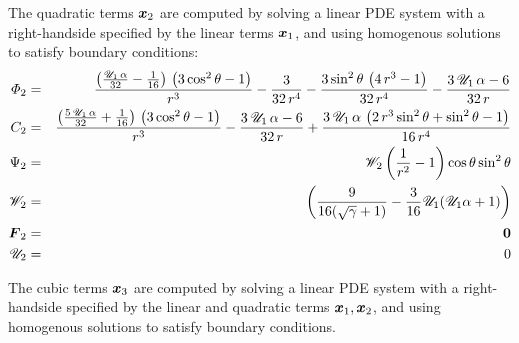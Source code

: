 The quadratic terms $\boldsymbol{x}_2$ are computed by solving a linear PDE system 
with a right-handside specified by the linear terms $\boldsymbol{x}_1$, and using 
homogenous solutions to satisfy boundary conditions:
\begin{eqnarray}
\varPhi_2 &=& \frac{\left(\frac{\mathscr{U}_1\, \alpha}{32} - \frac{1}{16}\right)\, \left(3\, {\cos^2\theta} - 1\right)}{r^3} - \frac{3}{32\, r^4} - \frac{3\, {\sin^2\theta}\, \left(4\, r^3 - 1\right)}{32\, r^4} - \frac{3\, \mathscr{U}_1\, \alpha - 6}{32\, r}
\\
C_2 &=& \frac{\left(\frac{5\, \mathscr{U}_1\, \alpha}{32} + \frac{1}{16}\right)\, \left(3\, {\cos^2\theta} - 1\right)}{r^3} - \frac{3\, \mathscr{U}_1\, \alpha - 6}{32\, r} + \frac{3\, \mathscr{U}_1\, \alpha\, \left(2\, r^3\, {\sin^2\theta} + {\sin^2\theta} - 1\right)}{16\, r^4}
\\
\Psi_2 &=& \mathscr{W}_2
 \left(\frac{1}{r^2} - 1\right) \cos\theta \sin^2\theta  \\
\mathscr{W}_2 &=& \left(\frac{9}{16(\sqrt{\gamma}+1)} - \frac{3}{16} \mathscr{U}_1 (\mathscr{U}_1 \alpha + 1)\right) \\
\boldsymbol{F}_2 &=& \boldsymbol{0} \\ \mathscr{U}_2 &=& 0
\end{eqnarray}

The cubic terms $\boldsymbol{x}_3$ are computed  by solving a linear PDE system 
with a right-handside specified by the linear and quadratic terms $\boldsymbol{x}_1, \boldsymbol{x}_2$, and using 
homogenous solutions to satisfy boundary conditions.

